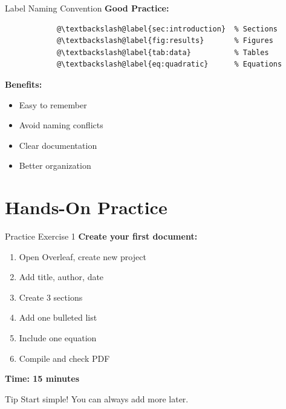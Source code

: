 \documentclass[aspectratio=169]{beamer}
\begin{document}
	\begin{frame}[fragile]{Label Naming Convention}
		\textbf{Good Practice:}
		
		\begin{lstlisting}
			@\textbackslash@label{sec:introduction}  % Sections
			@\textbackslash@label{fig:results}       % Figures
			@\textbackslash@label{tab:data}          % Tables
			@\textbackslash@label{eq:quadratic}      % Equations
		\end{lstlisting}
		
		\vspace{1em}
		
		\textbf{Benefits:}
		\begin{itemize}
			\item Easy to remember
			\item Avoid naming conflicts
			\item Clear documentation
			\item Better organization
		\end{itemize}
	\end{frame}
	
	\section{Hands-On Practice}
	
	\begin{frame}{Practice Exercise 1}
		\textbf{Create your first document:}
		
		\begin{enumerate}
			\item Open Overleaf, create new project
			\item Add title, author, date
			\item Create 3 sections
			\item Add one bulleted list
			\item Include one equation
			\item Compile and check PDF
		\end{enumerate}
		
		\vspace{1em}
		
		\textbf{Time: 15 minutes}
		
		\vspace{0.5em}
		
		\begin{alertblock}{Tip}
			Start simple! You can always add more later.
		\end{alertblock}
	\end{frame}
	
\end{document}
